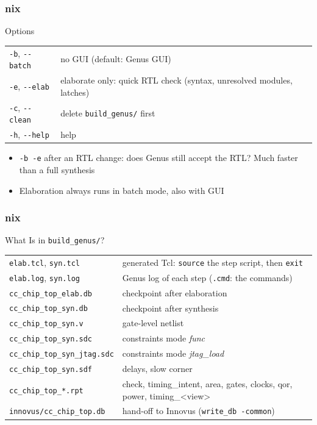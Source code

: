 \documentclass{beamer}
\newcommand{\astitle}{nix}
\newcommand{\assubtitle}{nix}
\newcommand{\cmd}[1]{\texttt{#1}}
\begin{document}
\renewcommand{\assubtitle}{Options}
\begin{frame}
\frametitle{\astitle}
\begin{block}{\assubtitle}
  \footnotesize
  \begin{tabularx}{\linewidth}{@{}lY@{}}
    \cmd{-b}, \cmd{-{}-batch}   & no GUI (default: Genus GUI)\\[2pt]
    \cmd{-e}, \cmd{-{}-elab}    & elaborate only: quick RTL check (syntax,
                                  unresolved modules, latches)\\[2pt]
    \cmd{-c}, \cmd{-{}-clean}   & delete \cmd{build\_genus/} first\\[2pt]
    \cmd{-h}, \cmd{-{}-help}    & help\\
  \end{tabularx}
  \vspace{6pt}
  \begin{itemize}
    \item \cmd{-b -e} after an RTL change: does Genus still accept the RTL?
      Much faster than a full synthesis
    \item Elaboration always runs in batch mode, also with GUI
  \end{itemize}
\end{block}
\end{frame}

\renewcommand{\assubtitle}{What Is in \texttt{build\_genus/}?}
\begin{frame}
\frametitle{\astitle}
\begin{block}{\assubtitle}
  \scriptsize
  \begin{tabularx}{\linewidth}{@{}lY@{}}
    \cmd{elab.tcl}, \cmd{syn.tcl}       & generated Tcl: \cmd{source} the step script, then \cmd{exit}\\[1pt]
    \cmd{elab.log}, \cmd{syn.log}       & Genus log of each step (\cmd{.cmd}: the commands)\\[1pt]
    \cmd{cc\_chip\_top\_elab.db}        & checkpoint after elaboration\\[1pt]
    \cmd{cc\_chip\_top\_syn.db}         & checkpoint after synthesis\\[1pt]
    \cmd{cc\_chip\_top\_syn.v}          & gate-level netlist\\[1pt]
    \cmd{cc\_chip\_top\_syn.sdc}        & constraints mode \emph{func}\\[1pt]
    \cmd{cc\_chip\_top\_syn\_jtag.sdc}  & constraints mode \emph{jtag\_load}\\[1pt]
    \cmd{cc\_chip\_top\_syn.sdf}        & delays, slow corner\\[1pt]
    \cmd{cc\_chip\_top\_*.rpt}          & check, timing\_intent, area, gates, clocks,
                                          qor, power, timing\_<view>\\[1pt]
    \cmd{innovus/cc\_chip\_top.db}      & hand-off to Innovus (\cmd{write\_db -common})\\
  \end{tabularx}
\end{block}
\end{frame}
\end{document}
